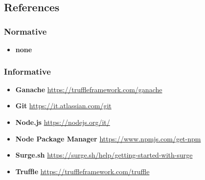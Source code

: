 \subsection{References}

\subsubsection{Normative}
\begin{itemize}
	\item \textbf{none}
\end{itemize}

\subsubsection{Informative}
\begin{itemize}
	\item \textbf{Ganache} \href{https://truffleframework.com/ganache}{https://truffleframework.com/ganache}
	\item \textbf{Git} \href{https://it.atlassian.com/git}{https://it.atlassian.com/git}
	\item \textbf{Node.js} \href{https://nodejs.org/it/}{https://nodejs.org/it/}
	\item \textbf{Node Package Manager} \href{https://www.npmjs.com/get-npm	}{https://www.npmjs.com/get-npm}
	\item \textbf{Surge.sh} \href{https://surge.sh/help/getting-started-with-surge}{https://surge.sh/help/getting-started-with-surge}
	\item \textbf{Truffle} \href{https://truffleframework.com/truffle}{https://truffleframework.com/truffle}
\end{itemize}